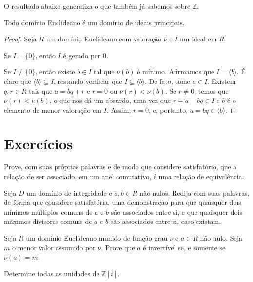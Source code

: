 O resultado abaixo generaliza o que também já sabemos sobre $\mathbb Z$.
\begin{prop}
Todo domínio Euclideano é um domínio de ideais principais.
\end{prop}
\begin{proof}
    Seja $R$ um domínio Euclideano com valoração $\nu$ e $I$ um ideal em $R$.

    Se $I=\{0\}$, então $I$ é gerado por $0$.

    Se $I\neq \{0\}$, então existe $b\in I$ tal que $\nu(b)$ é mínimo.
    Afirmamos que $I=\langle b\rangle$.
    É claro que $\langle b\rangle\subseteq I$, restando verificar que $I\subseteq \langle b\rangle$.
    De fato, tome $a \in I$.
    Existem $q, r \in R$ tais que $a=bq+r$ e $r=0$ ou $\nu(r)<\nu(b)$.
    Se $r\neq 0$, temos que $\nu(r)<\nu(b)$, o que nos dá um absurdo, uma vez que $r=a-bq\in I$ e $b$ é o elemento de menor valoração em $I$.
    Assim, $r=0$, e, portanto, $a=bq\in \langle b\rangle$.
\end{proof}





\section{Exercícios}

\begin{exer}
    Prove, com suas próprias palavras e de modo que considere satisfatório, que a relação de ser associado, em um anel comutativo, é uma relação de equivalência.
\end{exer}

\begin{exer}
    Seja $D$ um domínio de integridade e $a, b \in R$ não nulos.
    Redija com suas palavras, de forma que considere satisfatória, uma demonstração para que quaisquer dois mínimos múltiplos comuns de $a$ e $b$ são associados entre si, e que quaisquer dois máximos divisores comuns de $a$ e $b$ são associados entre si, caso existam.
\end{exer}
\begin{exer}
    Seja $R$ um domínio Euclideano munido de função grau $\nu$ e $a \in R$ não nulo.
    Seja $m$ o menor valor assumido por $\nu$.
    Prove que $a$ é invertível se, e somente se $\nu(a)=m$.
\end{exer}

\begin{exer}
    Determine todas as unidades de $\mathbb Z[i]$.
\end{exer}

